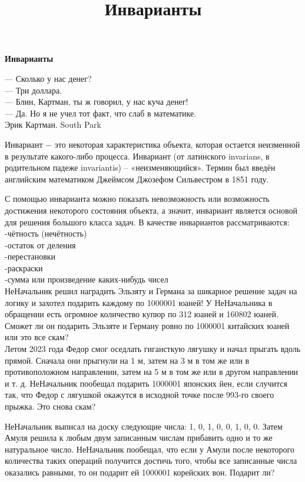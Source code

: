 \centerline{\bf \Huge Инварианты}
\title{Инварианты}

\begin{flushright}
    \scriptsize
    — Сколько у нас денег?\\
    — Три доллара.\\
    — Блин, Картман, ты ж говорил, у нас куча денег!\\
    — Да. Но я не учел тот факт, что слаб в математике.\\
    Эрик Картман. South Park
\end{flushright}

Инвариант $-$ это некоторая характеристика объекта, которая остается неизменной в результате какого-либо процесса. Инвариант (от латинского invarians, в родительном падеже invariantis) – «неизменяющийся». Термин был введён английским математиком Джеймсом Джозефом Сильвестром в 1851 году.

С помощью инварианта можно показать невозможность или возможность достижения некоторого состояния объекта, а значит, инвариант является основой для решения большого класса задач.
В качестве инвариантов рассматриваются: \\
-чётность (нечётность)\\
-остаток от деления\\
-перестановки\\
-раскраски\\
-сумма или произведение каких-нибудь чисел\\

НеНачальник решил наградить Эльзяту и Германа за шикарное решение задач на логику и захотел подарить каждому по 1000001 юаней! У НеНачальника в обращении есть огромное количество купюр по 312 юаней и 160802 юаней. Сможет ли он подарить Эльзяте и Герману ровно по 1000001 китайских юаней или это все скам?\\

Летом 2023 года Федор смог оседлать гигансткую лягушку и начал прыгать вдоль прямой. Сначала они прыгнули на 1 м, затем на 3 м в том же или в противоположном направлении, затем на 5 м в том же или в другом направлении и т. д. НеНачальник пообещал подарить 1000001 японских йен, если случится так, что Федор с лягушкой окажутся в исходной точке после 993-го своего прыжка. Это снова скам?\newpage

НеНачальник выписал на доску следующие числа: 1, 0, 1, 0, 0, 1, 0, 0. Затем Амуля решила к любым двум записанным числам прибавить одно и то же натуральное число. НеНачальник пообещал, что если у Амули после некоторого количества таких операций получится достичь того, чтобы все записанные числа оказались равными, то он подарит ей 1000001 корейских вон. Подарит ли?\\

